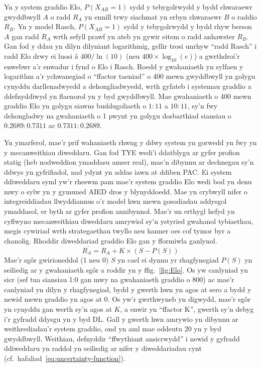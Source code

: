 Yn y system graddio Elo, $P(X_{AB} = 1)$ sydd y tebygolrwydd y bydd chwaraewr gwyddbwyll $A$ o radd $R_A$ yn ennill trwy siachmat yn erbyn chwaraewr $B$ o raddio $R_B$. Yn y model Rasch, $P(X_{AB} = 1)$ sydd y tebygolrwydd y bydd rhyw berson $A$ gan radd $R_A$ wrth sefyll prawf yn ateb yn gywir eitem o radd anhawster $R_B$. Gan fod y ddau yn dilyn dilyniant logarithmig, gellir trosi unrhyw ``radd Rasch'' i radd Elo drwy ei luosi â $400/\ln(10)$ (neu $400\times\log_{10}(e)$) a gwrthdroi'r enwebwr a'r enwadur i fynd o Elo i Rasch. Roedd y gwahaniaeth yn sylfaen y logarithm a'r ychwanegiad o ``ffactor taeniad'' o 400 mewn gwyddbwyll yn golygu cynyddu darllenadwyedd a dehongliadwyedd, wrth gyfateb i systemau graddio a ddefnyddiwyd yn flaenorol yn y byd gwyddbwyll. Mae gwahaniaeth o 400 mewn graddio Elo yn golygu siawns buddugoliaeth o $1:11$ a $10:11$, sy'n fwy dehongladwy na gwahaniaeth o 1 pwynt yn golygu dosbarthiad siansiau o $0.2689:0.7311$ ac $0.7311:0.2689$.

Yn ymarferol, mae'r prif wahaniaeth rhwng y ddwy system yn gorwedd yn fwy yn y mecanweithiau diweddaru. Gan fod TYE wedi'i ddatblygu ar gyfer profion statig (heb nodweddion ymaddasu amser real), mae'n dibynnu ar dechnegau sy'n ddwys yn gyfrifiadol, nad ydynt yn addas iawn at ddiben PAC\@. Ei system ddiweddaru syml yw'r rheswm pam mae'r system graddio Elo wedi bod yn denu mwy o sylw yn y gymuned AIED dros y blynyddoedd. Mae \cite{pelanek_applications_2016} yn crybwyll nifer o integreiddiadau llwyddiannus o'r model hwn mewn gosodiadau addysgol ymaddasol, er byth ar gyfer profion annibynnol. Mae'r un erthygl hefyd yn cyflwyno mecanweithiau diweddaru amrywiol sy'n ystyried gwahanol tybiaethau, megis cywiriad wrth strategaethau twyllo neu hanner oes cof tymor byr a chanolig. Rhoddir diweddariad graddio Elo gan y fformiwla ganlynol.
\begin{equation}
    R_{A}^{\prime}= R_A+K \times{(S-P(S))}
\end{equation}\label{eq:Update Elo}
Mae'r sgôr gwirioneddol (1 neu 0) $S$ yn cael ei dynnu yr rhagfynegiad $P(S)$ yn seiliedig ar y gwahaniaeth sgôr a roddir yn y ffig.~\ref{fig:Elo}. Os yw canlyniad yn sicr (sef tua siansiau  1:0 gan mwy na gwahaniaeth graddio o 800) ac mae'r canlyniad yn dilyn y rhagfynegiad, bydd y gwerth hwn yn agos at sero a bydd y newid mewn graddio yn agos at 0. Os yw'r gwrthwyneb yn digwydd, mae'r sgôr yn cynyddu gan werth sy'n agos at $K$, a enwir yn ``ffactor K'', gwerth sy'n debyg i'r gyfradd ddysgu yn y byd DL. Gall y gwerth hwn amrywio yn dibynnu ar weithrediadau'r system graddio, ond yn aml mae oddeutu 20 yn y byd gwyddbwyll. Weithiau, defnyddir ``ffwythiant ansicrwydd'' i newid y gyfradd ddiweddaru yn raddol yn seiliedig ar nifer y diweddariadau cynt (cf.\ hafaliad~\ref{eq:uncertainty-function}).

